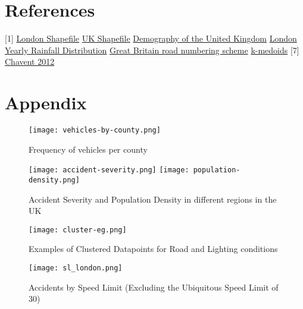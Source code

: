 \documentclass{neu_handout}
\begin{document}
\section{References}
 [1] \href{https://data.london.gov.uk/dataset/statistical-gis-boundary-files-london}{London Shapefile}
 \newline
 [2] \href{http://www.naturalearthdata.com} {UK Shapefile}
 \newline
 [3] \href{https://en.wikipedia.org/wiki/Demography_of_the_United_Kingdom}{Demography of the United Kingdom}
 \newline
 [4] \href{http://projectbritain.com/climate.html}{London Yearly Rainfall Distribution}
 \newline
 [5] \href{https://en.wikipedia.org/wiki/Great_Britain_road_numbering_scheme}{Great Britain road numbering scheme}
 \newline
 [6] \href{https://en.wikipedia.org/wiki/K-medoids}{k-medoids}
 [7] \href{Chavent M, Kuentz_Simonet V, Liquet B, Saracco J (2012) ClustOfVar: An R Package for the Clustering of Variables. Journal of Statistical Software 50(13)}{Chavent 2012}


\pagebreak
\section{Appendix}
\begin{figure}[!htb]
  \texttt{[image: vehicles-by-county.png]}
  \caption{Frequency of vehicles per county}
\end{figure}


\begin{figure}[!htb]
  \texttt{[image: accident-severity.png]}
\endminipage\hfill
{}
  \texttt{[image: population-density.png]}
  \endminipage
\caption{Accident Severity and Population Density in different regions in the UK}  
\end{figure}

\begin{figure}[!htb]
    \begin{center}
      \texttt{[image: cluster-eg.png]}
      \caption{Examples of Clustered Datapoints for Road and Lighting conditions}
    \end{center}
\end{figure}


\begin{figure}[!htb]
    \begin{center}
      \texttt{[image: sl\_london.png]}
      \caption{Accidents by Speed Limit (Excluding the Ubiquitous Speed Limit of 30)}
    \end{center}
\end{figure}
\end{document}
